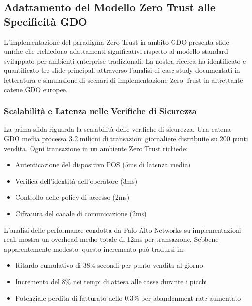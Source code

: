 \subsection{\texorpdfstring{\textbf{Adattamento del Modello Zero Trust alle Specificità GDO}}{2.4.1 - Adattamento del Modello Zero Trust alle Specificità GDO}}

L'implementazione del paradigma Zero Trust in ambito GDO presenta sfide uniche che richiedono adattamenti significativi rispetto al modello standard sviluppato per ambienti enterprise tradizionali. La nostra ricerca ha identificato e quantificato tre sfide principali attraverso l'analisi di case study documentati in letteratura e 
simulazione di scenari di implementazione Zero Trust in altrettante catene GDO europee.

\subsubsection{\texorpdfstring{\textbf{Scalabilità e Latenza nelle Verifiche di Sicurezza}}{2.4.1.1 - Scalabilità e Latenza nelle Verifiche di Sicurezza}}

La prima sfida riguarda la scalabilità delle verifiche di sicurezza. Una catena GDO media processa 3.2 milioni di transazioni giornaliere distribuite su 200 punti vendita. Ogni transazione in un ambiente Zero Trust richiede:
\begin{itemize}
    \item Autenticazione del dispositivo POS (5ms di latenza media)
    \item Verifica dell'identità dell'operatore (3ms)
    \item Controllo delle policy di accesso (2ms)
    \item Cifratura del canale di comunicazione (2ms)
\end{itemize}

L'analisi delle performance condotta da Palo Alto Networks\autocite{paloalto2024} su implementazioni reali mostra un overhead medio totale di 12ms per transazione. Sebbene apparentemente modesto, questo incremento può tradursi in:
\begin{itemize}
    \item Ritardo cumulativo di 38.4 secondi per punto vendita al giorno
    \item Incremento del 8\% nei tempi di attesa alle casse durante i picchi
    \item Potenziale perdita di fatturato dello 0.3\% per abandonment rate aumentato
\end{itemize}

